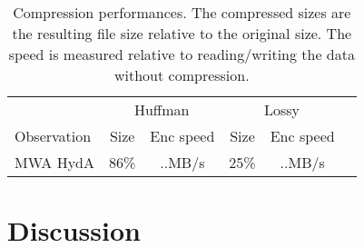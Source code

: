 \documentclass{article}
\begin{document}
\begin{table}
 \caption{Compression performances. The compressed sizes are the resulting file size relative to the original size. The speed is measured relative to reading/writing the data without compression.}
 \begin{tabular}{|l|c|c|c|c|c|}
  \hline
   & \multicolumn{2}{|c|}{Huffman} & \multicolumn{2}{|c|}{Lossy} \\
  Observation &  \multicolumn{1}{|c}{Size} & \multicolumn{1}{c|}{Enc speed} & \multicolumn{1}{|c}{Size}&\multicolumn{1}{c|}{Enc speed} \\
  \hline
  MWA HydA & 86\% & ..MB/s & 25\% & ..MB/s \\
  \hline
 \end{tabular}

\end{table}


\section{Discussion}


\printbibliography

\label{lastpage}
\end{document}
